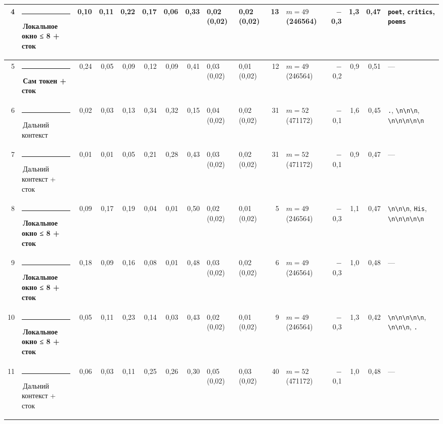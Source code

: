 \documentclass[10pt]{article}
\begin{document}
\begin{minipage}{\linewidth}
\begin{center}
{\begin{tabular}{|r|l|r|r|r|r|r|r|l|l|r|l|r|r|r|l|}
4 & \textcolor[HTML]{1BAF7A}{\rule{0.62em}{0.62em}}\,\textbf{Локальное окно ≤ 8 + сток} & 0,10 & 0,11 & 0,22 & 0,17 & 0,06 & 0,33 & 0,02 (0,02) & 0,02 (0,02) & 13 & $m{=}49$ (246564) & $-$0,3 & 1,3 & 0,47 & \texttt{\textvisiblespace{}poet}, \texttt{\textvisiblespace{}critics}, \texttt{\textvisiblespace{}poems} \\ \hline
5 & \textcolor[HTML]{2A78D6}{\rule{0.62em}{0.62em}}\,\textbf{Сам токен + сток} & 0,24 & 0,05 & 0,09 & 0,12 & 0,09 & 0,41 & 0,03 (0,02) & 0,01 (0,02) & 12 & $m{=}49$ (246564) & $-$0,2 & 0,9 & 0,51 & — \\ \hline
6 & \textcolor[HTML]{C3C2B7}{\rule{0.62em}{0.62em}}\,Дальний контекст & 0,02 & 0,03 & 0,13 & 0,34 & 0,32 & 0,15 & 0,04 (0,02) & 0,02 (0,02) & 31 & $m{=}52$ (471172) & $-$0,1 & 1,6 & 0,45 & \texttt{\textvisiblespace{}.}, \texttt{\textvisiblespace{}\textbackslash{}n\textbackslash{}n\textbackslash{}n}, \texttt{\textvisiblespace{}\textbackslash{}n\textbackslash{}n\textbackslash{}n\textbackslash{}n\textbackslash{}n} \\ \hline
7 & \textcolor[HTML]{C3C2B7}{\rule{0.62em}{0.62em}}\,Дальний контекст + сток & 0,01 & 0,01 & 0,05 & 0,21 & 0,28 & 0,43 & 0,03 (0,02) & 0,02 (0,02) & 31 & $m{=}52$ (471172) & $-$0,1 & 0,9 & 0,47 & — \\ \hline
8 & \textcolor[HTML]{1BAF7A}{\rule{0.62em}{0.62em}}\,\textbf{Локальное окно ≤ 8 + сток} & 0,09 & 0,17 & 0,19 & 0,04 & 0,01 & 0,50 & 0,02 (0,02) & 0,01 (0,02) & 5 & $m{=}49$ (246564) & $-$0,3 & 1,1 & 0,47 & \texttt{\textvisiblespace{}\textbackslash{}n\textbackslash{}n\textbackslash{}n}, \texttt{\textvisiblespace{}His}, \texttt{\textvisiblespace{}\textbackslash{}n\textbackslash{}n\textbackslash{}n\textbackslash{}n\textbackslash{}n} \\ \hline
9 & \textcolor[HTML]{1BAF7A}{\rule{0.62em}{0.62em}}\,\textbf{Локальное окно ≤ 8 + сток} & 0,18 & 0,09 & 0,16 & 0,08 & 0,01 & 0,48 & 0,03 (0,02) & 0,02 (0,02) & 6 & $m{=}49$ (246564) & $-$0,3 & 1,0 & 0,48 & — \\ \hline
10 & \textcolor[HTML]{1BAF7A}{\rule{0.62em}{0.62em}}\,\textbf{Локальное окно ≤ 8 + сток} & 0,05 & 0,11 & 0,23 & 0,14 & 0,03 & 0,43 & 0,02 (0,02) & 0,01 (0,02) & 9 & $m{=}49$ (246564) & $-$0,3 & 1,3 & 0,42 & \texttt{\textvisiblespace{}\textbackslash{}n\textbackslash{}n\textbackslash{}n\textbackslash{}n\textbackslash{}n}, \texttt{\textvisiblespace{}\textbackslash{}n\textbackslash{}n\textbackslash{}n}, \texttt{\textvisiblespace{}.} \\ \hline
11 & \textcolor[HTML]{C3C2B7}{\rule{0.62em}{0.62em}}\,Дальний контекст + сток & 0,06 & 0,03 & 0,11 & 0,25 & 0,26 & 0,30 & 0,05 (0,02) & 0,03 (0,02) & 40 & $m{=}52$ (471172) & $-$0,1 & 1,0 & 0,48 & — \\ \hline

\end{tabular}}
\end{center}
\end{minipage}
\end{document}
